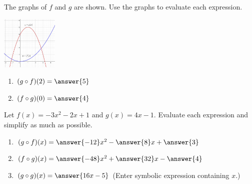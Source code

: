 \documentclass{ximera}
\begin{document}
\begin{problem}\label{prob:160hom2prob7}
The graphs of $f$ and $g$ are shown.  Use the graphs to evaluate each expression.
\begin{image}
   \includegraphics[height=1in]{160H2pic8.jpg}
 \end{image}
  \begin{enumerate}
\item
$(g\circ f)(2)=\answer{5}$

\item
$(f\circ g)(0)=\answer{4}$

  \end{enumerate}
\end{problem}
\begin{problem}\label{prob:160hom2prob8}
Let $f(x)=-3x^2-2x+1$ and $g(x)=4x-1$.  Evaluate each expression and simplify as much as possible.
\begin{enumerate}
    \item $(g\circ f)(x)=\answer{-12}x^2-\answer{8}x+\answer{3}$
    \item $(f\circ g)(x)=\answer{-48}x^2+\answer{32}x-\answer{4}$
    \item $(g\circ g)(x)=\answer{16x-5}$ (Enter symbolic expression containing $x$.)
\end{enumerate}
\end{problem}
\end{document}
